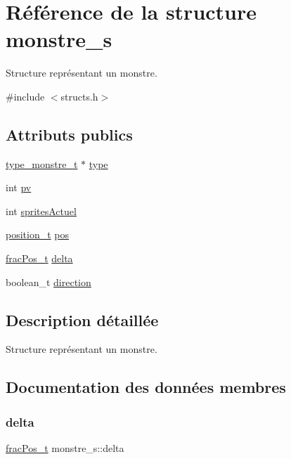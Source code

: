 \hypertarget{structmonstre__s}{}\section{Référence de la structure monstre\+\_\+s}
\label{structmonstre__s}


Structure représentant un monstre.  




{\ttfamily \#include $<$structs.\+h$>$}

\subsection*{Attributs publics}
\begin{DoxyCompactItemize}
\item 
\hyperlink{structtype__monstre__s}{type\+\_\+monstre\+\_\+t} $\ast$ \hyperlink{structmonstre__s_af58fb0da12d89fbdce602578f457560e}{type}
\item 
int \hyperlink{structmonstre__s_a1e26c0e85b90352f9496f331ec74e98d}{pv}
\item 
int \hyperlink{structmonstre__s_a94bfe0a4981f2656bbfd2ce29e4e7763}{sprites\+Actuel}
\item 
\hyperlink{structposition__s}{position\+\_\+t} \hyperlink{structmonstre__s_a972c2fb3087127d04bd3719d62c1030e}{pos}
\item 
\hyperlink{structfrac_pos__s}{frac\+Pos\+\_\+t} \hyperlink{structmonstre__s_af6ab2d77d3fc8726015c43ed81e699e0}{delta}
\item 
boolean\+\_\+t \hyperlink{structmonstre__s_aa1a2d6868b660addc5855614f1849540}{direction}
\end{DoxyCompactItemize}


\subsection{Description détaillée}
Structure représentant un monstre. 

\subsection{Documentation des données membres}
\mbox{\label{structmonstre__s_af6ab2d77d3fc8726015c43ed81e699e0}} 
\subsubsection{\texorpdfstring{delta}{delta}}
{\footnotesize\ttfamily \hyperlink{structfrac_pos__s}{frac\+Pos\+\_\+t} monstre\+\_\+s\+::delta}

